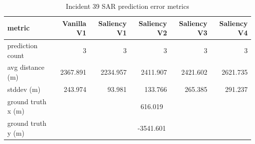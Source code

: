 \begin{table}[ht]
\centering
\caption{Incident 39 SAR prediction error metrics}
\label{tab:sar-incident-39}
\begin{tabular}{lrrrrr}
\hline
metric & Vanilla V1 & Saliency V1 & Saliency V2 & Saliency V3 & Saliency V4 \\
\hline
prediction count & 3 & 3 & 3 & 3 & 3 \\
avg distance (m) & 2367.891 & 2234.957 & 2411.907 & 2421.602 & 2621.735 \\
stddev (m) & 243.974 & 93.981 & 133.766 & 265.385 & 291.237 \\
ground truth x (m) & \multicolumn{5}{c}{616.019} \\
ground truth y (m) & \multicolumn{5}{c}{-3541.601} \\
\hline
\end{tabular}
\end{table}
